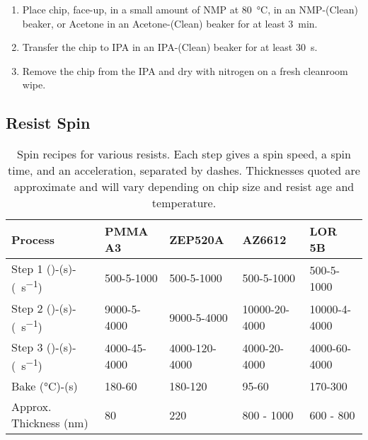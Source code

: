 
\begin{enumerate}
    \item Place chip, face-up, in a small amount of NMP at \SI{80}{\celsius}, in an NMP-(Clean) beaker, or Acetone in an Acetone-(Clean) beaker for at least \SI{3}{\minute}.
    \item Transfer the chip to IPA in an IPA-(Clean) beaker for at least \SI{30}{\second}.
    \item Remove the chip from the IPA and dry with nitrogen on a fresh cleanroom wipe.
\end{enumerate}

\newcommand{\spinunits}{(\si{\rpm})-(\si{\second})-(\si{\rpm\per\second})}
\subsection{Resist Spin}
\label{sec:spin}

\begin{table}
    \centering
    \hspace*{-1cm}
    \begin{tabular}{lllll}
        \toprule
        Process                                  & PMMA A3     & ZEP520A       & AZ6612       & LOR 5B\\
        \midrule
        Step 1 \spinunits                        & 500-5-1000   & 500-5-1000   & 500-5-1000   & 500-5-1000   \\
        Step 2 \spinunits                        & 9000-5-4000  & 9000-5-4000  & 10000-20-4000& 10000-4-4000 \\
        Step 3 \spinunits                        & 4000-45-4000 & 4000-120-4000& 4000-20-4000 & 4000-60-4000 \\
        Bake (\si{\celsius})-(\si{\second})      & 180-60       & 180-120      & 95-60        & 170-300      \\
        Approx. Thickness (\si{\nano\meter})     & 80           & 220          & 800 - 1000   & 600 - 800    \\
        \bottomrule
    \end{tabular}
    \hspace*{-1cm}
    \caption[Spin recipes for various resists]
    {Spin recipes for various resists. Each step gives a spin speed, a spin time, and an acceleration, separated by dashes.
    Thicknesses quoted are approximate and will vary depending on chip size and resist age and temperature.}
    \label{tab:spin}
\end{table}

